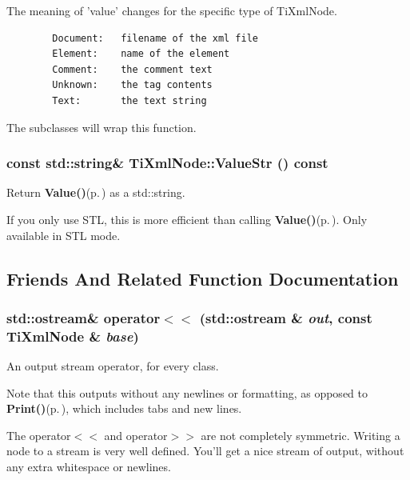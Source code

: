 The meaning of 'value' changes for the specific type of Ti\-Xml\-Node. 



\footnotesize\begin{verbatim}
		Document:	filename of the xml file
		Element:	name of the element
		Comment:	the comment text
		Unknown:	the tag contents
		Text:		the text string
		\end{verbatim}
\normalsize


The subclasses will wrap this function.
\subsubsection{\setlength{\rightskip}{0pt plus 5cm}const std::string\& Ti\-Xml\-Node::Value\-Str () const\hspace{0.3cm}{\tt  [inline, inherited]}}\label{classTiXmlNode_TiXmlUnknowna8}


Return {\bf Value()}{\rm (p.\,\pageref{classTiXmlNode_TiXmlUnknowna7})} as a std::string. 

If you only use STL, this is more efficient than calling {\bf Value()}{\rm (p.\,\pageref{classTiXmlNode_TiXmlUnknowna7})}. Only available in STL mode.

\subsection{Friends And Related Function Documentation}
\subsubsection{\setlength{\rightskip}{0pt plus 5cm}std::ostream\& operator$<$$<$ (std::ostream \& {\em out}, const {\bf Ti\-Xml\-Node} \& {\em base})\hspace{0.3cm}{\tt  [friend, inherited]}}\label{classTiXmlNode_TiXmlUnknownn1}


An output stream operator, for every class. 

Note that this outputs without any newlines or formatting, as opposed to {\bf Print()}{\rm (p.\,\pageref{classTiXmlBase_TiXmlNodea73})}, which includes tabs and new lines.

The operator$<$$<$ and operator$>$$>$ are not completely symmetric. Writing a node to a stream is very well defined. You'll get a nice stream of output, without any extra whitespace or newlines.

